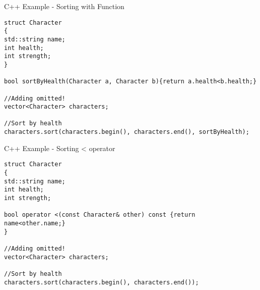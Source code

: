 \begin{frame}[fragile]{C++ Example - Sorting with Function }
\begin{lstlisting}
struct Character
{
std::string name;
int health;
int strength;
}

bool sortByHealth(Character a, Character b){return a.health<b.health;}

//Adding omitted!
vector<Character> characters;

//Sort by health
characters.sort(characters.begin(), characters.end(), sortByHealth);
\end{lstlisting}
\end{frame}

\begin{frame}[fragile]{C++ Example - Sorting < operator }
\begin{lstlisting}
struct Character
{
std::string name;
int health;
int strength;

bool operator <(const Character& other) const {return name<other.name;}
}

//Adding omitted!
vector<Character> characters;

//Sort by health
characters.sort(characters.begin(), characters.end());
\end{lstlisting}
\end{frame}
